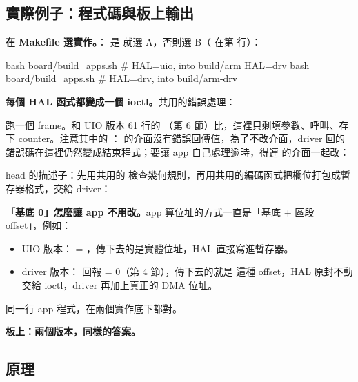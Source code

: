 \subsection{實際例子：程式碼與板上輸出}

\textbf{在 Makefile 選實作。}： 是  就選 A，否則選 B（ 在第  行）：


\begin{cmdline}
bash board/build_apps.sh            # HAL=uio, into build/arm
HAL=drv bash board/build_apps.sh    # HAL=drv, into build/arm-drv
\end{cmdline}

\textbf{每個 HAL 函式都變成一個 ioctl。}共用的錯誤處理：


跑一個 frame。和 UIO 版本 61 行的 （第 6 節）比，這裡只剩填參數、呼叫、存下 counter。注意其中的 ： 的介面沒有錯誤回傳值，為了不改介面，driver 回的錯誤碼在這裡仍然變成結束程式；要讓 app 自己處理逾時，得連  的介面一起改：


head 的描述子：先用共用的  檢查幾何規則，再用共用的編碼函式把欄位打包成暫存器格式，交給 driver：


\textbf{「基底 0」怎麼讓 app 不用改。}app 算位址的方式一直是「基底 + 區段 offset」，例如：


\begin{itemize}
\item UIO 版本： = ，傳下去的是實體位址，HAL 直接寫進暫存器。
\item driver 版本： 回報  = 0（第 4 節），傳下去的就是  這種 offset，HAL 原封不動交給 ioctl，driver 再加上真正的 DMA 位址。
\end{itemize}

同一行 app 程式，在兩個實作底下都對。

\textbf{板上：兩個版本，同樣的答案。}


\subsection{原理}

